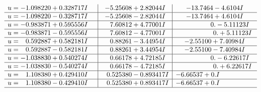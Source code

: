 \documentclass[1p]{elsarticle_modified}
\theoremstyle{definition}
\begin{document}
$$\begin{array}{c|c|c}
\begin{aligned}
u &= -1.098220 + 0.328717 I\end{aligned}
 & -5.25608 + 2.82044 I & -13.7464 - 4.6104 I \\ \hline\begin{aligned}
u &= -1.098220 - 0.328717 I\end{aligned}
 & -5.25608 - 2.82044 I & -13.7464 + 4.6104 I \\ \hline\begin{aligned}
u &= -0.983871 + 0.595556 I\end{aligned}
 & \phantom{-}7.60812 + 4.77001 I & \phantom{-0.000000 } 0. - 5.11123 I \\ \hline\begin{aligned}
u &= -0.983871 - 0.595556 I\end{aligned}
 & \phantom{-}7.60812 - 4.77001 I & \phantom{-0.000000 -}0. + 5.11123 I \\ \hline\begin{aligned}
u &= \phantom{-}0.592887 + 0.582181 I\end{aligned}
 & \phantom{-}0.88261 - 3.44954 I & -2.55100 + 7.40984 I \\ \hline\begin{aligned}
u &= \phantom{-}0.592887 - 0.582181 I\end{aligned}
 & \phantom{-}0.88261 + 3.44954 I & -2.55100 - 7.40984 I \\ \hline\begin{aligned}
u &= -1.038830 + 0.540274 I\end{aligned}
 & \phantom{-}0.66178 + 4.72185 I & \phantom{-0.000000 } 0. - 6.22617 I \\ \hline\begin{aligned}
u &= -1.038830 - 0.540274 I\end{aligned}
 & \phantom{-}0.66178 - 4.72185 I & \phantom{-0.000000 -}0. + 6.22617 I \\ \hline\begin{aligned}
u &= \phantom{-}1.108380 + 0.429410 I\end{aligned}
 & \phantom{-}0.525380 - 0.893417 I & -6.66537 + 0. I\phantom{ +0.000000I} \\ \hline\begin{aligned}
u &= \phantom{-}1.108380 - 0.429410 I\end{aligned}
 & \phantom{-}0.525380 + 0.893417 I & -6.66537 + 0. I\phantom{ +0.000000I}\\
 \hline 
 \end{array}$$\newpage$$\begin{array}{c|c|c}  

\end{array}$$
\end{document}
